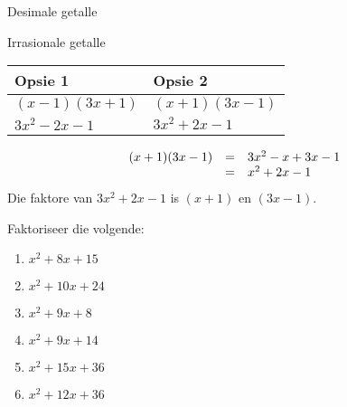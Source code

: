 \begin{Aktiwiteit}{Desimale getalle}
\begin{aktiwiteit}{Irrasionale getalle}
\begin{wex}
{\begin{table}[H]
\begin{center}
\label{m39394*id277097}
\noindent

\begin{tabular}{|l|l|}\hline
Opsie 1 &
Opsie 2%
\\ \hline
$(x-1)(3x+1)$
&
$(x+1)(3x-1)$
\\ \hline
$3{x}^{2}-2x-1$
&
\uline{
$3{x}^{2}+2x-1$
}
\\ \hline
\end{tabular}
\end{center}
\end{table}

\begin{equation*}
\begin{array}{ccl}  
(x+1)(3x-1)& =& 3{x}^{2}-x+3x-1\hfill \\ & =& {x}^{2}+2x-1\end{array}
\end{equation*}
\westep{}
Die faktore van $3{x}^{2}+2x-1$ is $(x+1)$ en $(3x-1)$.

}
\end{wex}


\begin{exercises}{}
{
Faktoriseer die volgende:
\begin{multicols}{2}
\begin{enumerate}[itemsep=5pt, label=\textbf{\arabic*}. ] 
\item ${x}^{2}+8x+15$
\item ${x}^{2}+10x+24$
\item ${x}^{2}+9x+8$
\item ${x}^{2}+9x+14$
\item ${x}^{2}+15x+36$
\item ${x}^{2}+12x+36$
\end{enumerate}
\end{multicols}


}
\end{exercises}
\end{aktiwiteit}
\end{Aktiwiteit}
